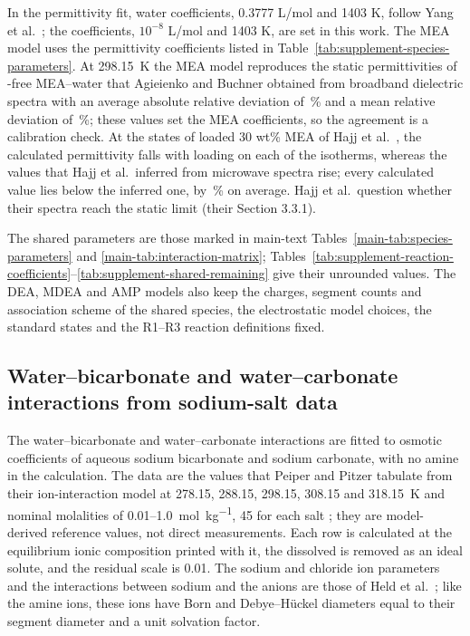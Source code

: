 \documentclass[a4paper,11pt]{article}
\begin{document}
In the permittivity fit, water coefficients, 0.3777 L/mol and 1403 K, follow Yang et al.\ \cite{Yang2024}; the \COtwo coefficients, $10^{-8}$ L/mol and 1403 K, are set in this work.
The MEA model uses the permittivity coefficients listed in Table~\ref{tab:supplement-species-parameters}.
At \SI{298.15}{\kelvin} the MEA model reproduces the  static permittivities of \COtwo-free MEA--water that Agieienko and Buchner obtained from broadband dielectric spectra \cite{agieienkoWhatGasStream2024a} with an average absolute relative deviation of \,\% and a mean relative deviation of \,\%; these values set the MEA coefficients, so the agreement is a calibration check.
At the  states of loaded 30 wt\% MEA of Hajj et al.\ \cite{Hajj2024}, the calculated permittivity falls with loading on each of the  isotherms, whereas the values that Hajj et al.\ inferred from microwave spectra rise; every calculated value lies below the inferred one, by \,\% on average.
Hajj et al.\ question whether their spectra reach the static limit (their Section 3.3.1).

The shared parameters are those marked in main-text Tables~\ref{main-tab:species-parameters} and \ref{main-tab:interaction-matrix}; Tables~\ref{tab:supplement-reaction-coefficients}--\ref{tab:supplement-shared-remaining} give their unrounded values.
The DEA, MDEA and AMP models also keep the charges, segment counts and association scheme of the shared species, the electrostatic model choices, the standard states and the R1--R3 reaction definitions fixed.



\subsection{Water--bicarbonate and water--carbonate interactions from sodium-salt data}\label{sec:s-salt}
The water--bicarbonate and water--carbonate interactions are fitted to osmotic coefficients of aqueous sodium bicarbonate and sodium carbonate, with no amine in the calculation.
The data are the values that Peiper and Pitzer tabulate from their ion-interaction model at 278.15, 288.15, 298.15, 308.15 and \SI{318.15}{\kelvin} and nominal molalities of 0.01--\SI{1.0}{\mole\per\kilogram}, 45 for each salt \cite{peiperThermodynamicsAqueousCarbonate1982}; they are model-derived reference values, not direct measurements.
Each row is calculated at the equilibrium ionic composition printed with it, the dissolved \COtwo is removed as an ideal solute, and the residual scale is 0.01.
The sodium and chloride ion parameters and the interactions between sodium and the anions are those of Held et al.\ \cite{Held2014}; like the amine ions, these ions have Born and Debye--H\"uckel diameters equal to their segment diameter and a unit solvation factor.
\end{document}
